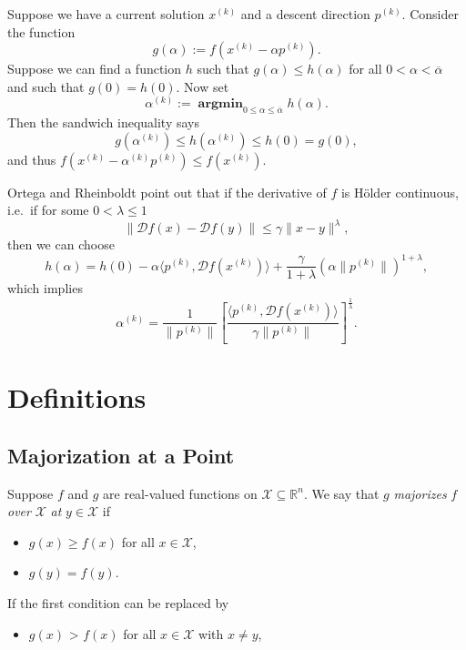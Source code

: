\documentclass[
  12pt,
]{book}
\providecommand{\tightlist}{%
  \setlength{\itemsep}{0pt}\setlength{\parskip}{0pt}}
\begin{document}
Suppose we have a current solution \(x^{(k)}\) and a descent direction \(p^{(k)}\).
Consider the function
\[
g(\alpha):=f(x^{(k)}-\alpha p^{(k)}).
\]
Suppose we can find a function \(h\) such that \(g(\alpha)\leq h(\alpha)\)
for all \(0<\alpha<\overline{\alpha}\) and such that \(g(0)=h(0)\). Now set
\[
\alpha^{(k)}:=\mathop{\mathbf{argmin}}_{0\leq\alpha\leq\overline{\alpha}}h(\alpha).
\]
Then the sandwich inequality says
\[
g(\alpha^{(k)})\leq h(\alpha^{(k)})\leq h(0)=g(0),
\]
and thus \(f(x^{(k)}-\alpha^{(k)}p^{(k)})\leq f(x^{(k)}).\)

Ortega and Rheinboldt point out that if the derivative of \(f\) is Hölder continuous, i.e.~if for some \(0<\lambda\leq 1\)
\[
\|\mathcal{D}f(x)-\mathcal{D}f(y)\|\leq\gamma\|x-y\|^\lambda,
\]
then we can choose
\[
h(\alpha)=h(0)-\alpha\langle p^{(k)},\mathcal{D}f(x^{(k)})\rangle+\frac{\gamma}{1+\lambda}(\alpha\|p^{(k)}\|)^{1+\lambda},
\]
which implies
\[
\alpha^{(k)}=\frac{1}{\|p^{(k)}\|}\left[\frac{\langle p^{(k)},\mathcal{D}f(x^{(k)})\rangle}{\gamma\|p^{(k)}\|}\right]^{\frac{1}{\lambda}}.
\]

\hypertarget{definitions}{%
\section{Definitions}\label{definitions}}

\hypertarget{majorization-at-a-point}{%
\subsection{Majorization at a Point}\label{majorization-at-a-point}}

Suppose \(f\) and \(g\) are real-valued functions on \(\mathcal{X}\subseteq\mathbb{R}^{n}\). We say
that \(g\) \emph{majorizes} \(f\) \emph{over} \(\mathcal{X}\) \emph{at} \(y\in\mathcal{X}\) if

\begin{itemize}
\tightlist
\item
  \(g(x)\geq f(x)\) for all \(x\in\mathcal{X}\),
\item
  \(g(y)=f(y)\).
\end{itemize}

If the first condition can be replaced by

\begin{itemize}
\tightlist
\item
  \(g(x)\) \textgreater{} \(f(x)\) for all \(x\in\mathcal{X}\) with \(x\not= y\),
\end{itemize}
\end{document}
